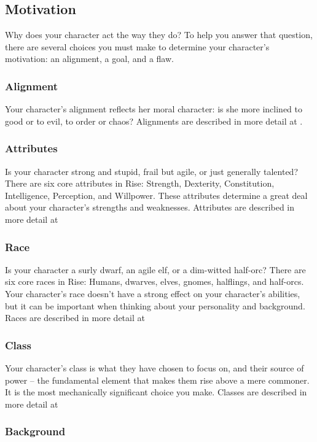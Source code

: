 \subsection{Motivation}

Why does your character act the way they do?
To help you answer that question, there are several choices you must make to determine your character's motivation: an alignment, a goal, and a flaw.

\subsubsection{Alignment}

Your character's alignment reflects her moral character: is she more inclined to good or to evil, to order or chaos?
Alignments are described in more detail at .

\subsubsection{Attributes}
Is your character strong and stupid, frail but agile, or just generally talented?
There are six core attributes in Rise: Strength, Dexterity, Constitution, Intelligence, Perception, and Willpower.
These attributes determine a great deal about your character's strengths and weaknesses.
Attributes are described in more detail at 

\subsubsection{Race}
Is your character a surly dwarf, an agile elf, or a dim-witted half-orc?
There are six core races in Rise: Humans, dwarves, elves, gnomes, halflings, and half-orcs.
Your character's race doesn't have a strong effect on your character's abilities, but it can be important when thinking about your personality and background.
Races are described in more detail at 

\subsubsection{Class}
Your character's class is what they have chosen to focus on, and their source of power -- the fundamental element that makes them rise above a mere commoner.
It is the most mechanically significant choice you make.
Classes are described in more detail at 

\subsubsection{Background}

